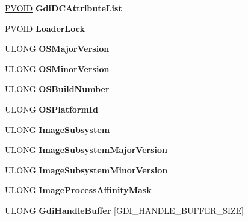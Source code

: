 \begin{DoxyCompactItemize}
\mbox{\label{struct___p_e_b_aa0135f9fca83614d1f0f9a5be847b712}} 
\hyperlink{interfacevoid}{P\+V\+O\+ID} {\bfseries Gdi\+D\+C\+Attribute\+List}
\item 
\mbox{\label{struct___p_e_b_a256502140655325675e3f06cb9e4090e}} 
\hyperlink{interfacevoid}{P\+V\+O\+ID} {\bfseries Loader\+Lock}
\item 
\mbox{\label{struct___p_e_b_abde8158594c43beb87a3e6f7c58a07a5}} 
U\+L\+O\+NG {\bfseries O\+S\+Major\+Version}
\item 
\mbox{\label{struct___p_e_b_a8eea784fff2111e34f75f7664f51c582}} 
U\+L\+O\+NG {\bfseries O\+S\+Minor\+Version}
\item 
\mbox{\label{struct___p_e_b_ac2e2ada6e31ff7c09712dd8c9e9d4873}} 
U\+L\+O\+NG {\bfseries O\+S\+Build\+Number}
\item 
\mbox{\label{struct___p_e_b_ae0c63d19d2e892118e5e0f616ad05a71}} 
U\+L\+O\+NG {\bfseries O\+S\+Platform\+Id}
\item 
\mbox{\label{struct___p_e_b_a23af3d305d458cae964dae70284a4b21}} 
U\+L\+O\+NG {\bfseries Image\+Subsystem}
\item 
\mbox{\label{struct___p_e_b_ade70ce02c0bac1a20ca3c0906378df76}} 
U\+L\+O\+NG {\bfseries Image\+Subsystem\+Major\+Version}
\item 
\mbox{\label{struct___p_e_b_aa9f0b51cca1229b3188c8aacf1340d52}} 
U\+L\+O\+NG {\bfseries Image\+Subsystem\+Minor\+Version}
\item 
\mbox{\label{struct___p_e_b_a3a08573941b9698a9974d69dabd71dd1}} 
U\+L\+O\+NG {\bfseries Image\+Process\+Affinity\+Mask}
\item 
\mbox{\label{struct___p_e_b_aee7303dbcb7e1f493843ec803f91cdac}} 
U\+L\+O\+NG {\bfseries Gdi\+Handle\+Buffer} \mbox{[}G\+D\+I\+\_\+\+H\+A\+N\+D\+L\+E\+\_\+\+B\+U\+F\+F\+E\+R\+\_\+\+S\+I\+ZE\mbox{]}
\item 
\mbox{\label{struct___p_e_b_af5f5296dcf3c0c893feb20369e5ee6ee}} 

\end{DoxyCompactItemize}

